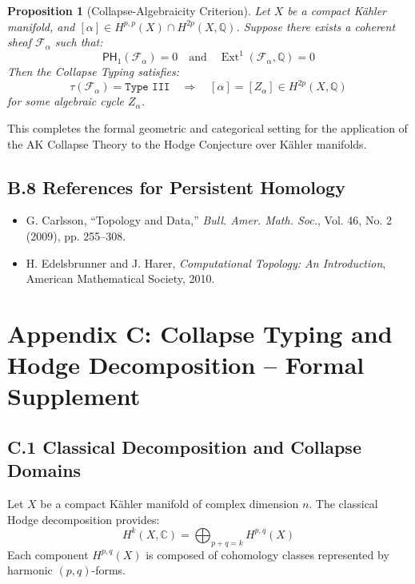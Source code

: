 \documentclass[11pt]{article}
\newtheorem{proposition}[theorem]{Proposition}
\DeclareMathOperator{\Ext}{Ext}
\begin{document}
\begin{proposition}[Collapse-Algebraicity Criterion]
Let $X$ be a compact Kähler manifold, and $[\alpha] \in H^{p,p}(X) \cap H^{2p}(X, \mathbb{Q})$. Suppose there exists a coherent sheaf $\mathcal{F}_\alpha$ such that:
\[
\mathsf{PH}_1(\mathcal{F}_\alpha) = 0 \quad \text{and} \quad \Ext^1(\mathcal{F}_\alpha, \mathbb{Q}) = 0
\]
Then the Collapse Typing satisfies:
\[
\tau(\mathcal{F}_\alpha) = \texttt{Type III}
\quad \Rightarrow \quad [\alpha] = [Z_\alpha] \in H^{2p}(X, \mathbb{Q})
\]
for some algebraic cycle $Z_\alpha$.
\end{proposition}

This completes the formal geometric and categorical setting for the application of the AK Collapse Theory to the Hodge Conjecture over Kähler manifolds.

\subsection*{B.8 References for Persistent Homology}
\begin{itemize}
  \item G. Carlsson, ``Topology and Data,'' \emph{Bull. Amer. Math. Soc.}, Vol. 46, No. 2 (2009), pp. 255–308.
  \item H. Edelsbrunner and J. Harer, \emph{Computational Topology: An Introduction}, American Mathematical Society, 2010.
\end{itemize}




\appendix

\section*{Appendix C: Collapse Typing and Hodge Decomposition – Formal Supplement}


\subsection*{C.1 Classical Decomposition and Collapse Domains}

Let $X$ be a compact Kähler manifold of complex dimension $n$.  
The classical Hodge decomposition provides:
\[
H^k(X, \mathbb{C}) = \bigoplus_{p+q = k} H^{p,q}(X)
\]
Each component $H^{p,q}(X)$ is composed of cohomology classes represented by harmonic $(p,q)$-forms.  
\end{document}
